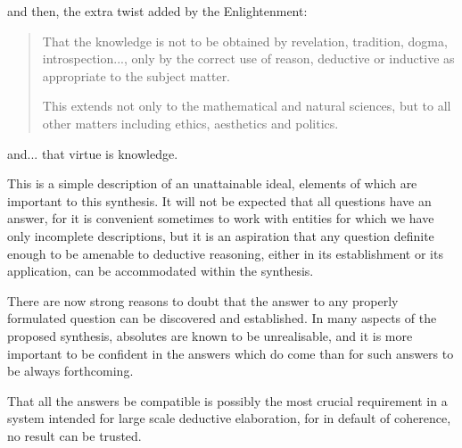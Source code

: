 and then, the extra twist added by the Enlightenment:
\begin{quotation}
That the knowledge is not to be obtained by revelation, tradition, dogma, introspection..., only by the correct use of reason, deductive or inductive as appropriate to the subject matter.

This extends not only to the mathematical and natural sciences, but to all other matters including ethics, aesthetics and politics.
\end{quotation}
and... that virtue is knowledge.

This is a simple description of an unattainable ideal, elements of which are important to this synthesis.
It will not be expected that all questions have an answer, for it is convenient sometimes to work with entities for which we have only incomplete descriptions, but it is an aspiration that any question definite enough to be amenable to deductive reasoning, either in its establishment or its application, can be accommodated within the synthesis.

There are now strong reasons to doubt that the answer to any properly formulated question can be discovered and established.
In many aspects of the proposed synthesis, absolutes are known to be unrealisable, and it is more important to be confident in the answers which do come than for such answers to be always forthcoming.

That all the answers be compatible is possibly the most crucial requirement in a system intended for large scale deductive elaboration, for in default of coherence, no result can be trusted.
